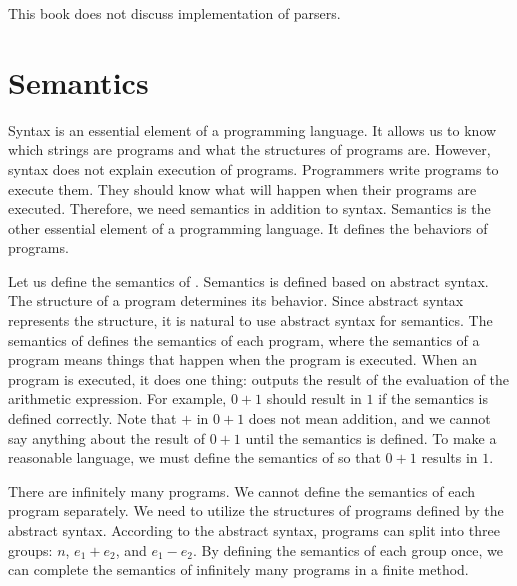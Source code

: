 \begin{center}
\end{center}

This book does not discuss implementation of parsers.

\section{Semantics}

Syntax is an essential element of a programming language. It allows us to know
which strings are programs and what the structures of programs are. However,
syntax does not explain execution of programs. Programmers write programs to
execute them. They should know what will happen when their programs are
executed. Therefore, we need semantics in addition to syntax. Semantics is the
other essential element of a programming language. It defines the behaviors of
programs.

Let us define the semantics of \Lang. Semantics is defined based on abstract
syntax. The structure of a program determines its behavior. Since abstract
syntax represents the structure, it is natural to use abstract syntax for
semantics. The semantics of \Lang defines the semantics of each \Lang program,
where the semantics of a program means things that happen when the program is
executed. When an \Lang program is executed, it does one thing: outputs the
result of the evaluation of the arithmetic expression.
For example, $0+1$ should result
in $1$ if the semantics is defined correctly. Note that $+$ in $0+1$ does not
mean addition, and we cannot say anything about the result of $0+1$ until the
semantics is defined. To make \Lang a reasonable language, we must define the
semantics of \Lang so that $0+1$ results in $1$.

There are infinitely many programs. We cannot define the semantics of each
program separately. We need to utilize the structures of programs defined by the
abstract syntax. According to the abstract syntax, programs can split into three
groups: $n$, $e_1+e_2$, and $e_1-e_2$. By defining the semantics of each group
once, we can complete the semantics of infinitely many programs in a finite
method.

